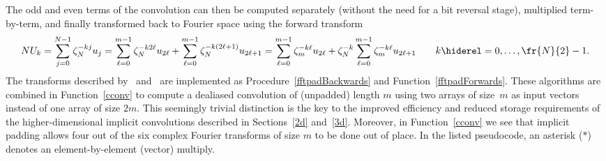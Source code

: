 \documentclass[final]{siamltex}
\def\bel{\begin{dmath}}
\def\eel{\end{dmath}}
\def\no{\hiderel}
\begin{document}
The odd and even terms of the convolution can then be computed separately
(without the need for a bit reversal stage), multiplied term-by-term, and
finally transformed back to Fourier space using the forward transform
\bel
NU_k=\sum_{j=0}^{N-1}\zeta_N^{-kj} u_j
=\sum_{\ell=0}^{m-1}\zeta_N^{-k2\ell} u_{2\ell}
+\sum_{\ell=0}^{m-1}\zeta_N^{-k(2\ell+1)} u_{2\ell+1}
=\sum_{\ell=0}^{m-1}\zeta_m^{-k\ell} u_{2\ell}
+\zeta_N^{-k}\sum_{\ell=0}^{m-1}\zeta_m^{-k\ell} u_{2\ell+1}
\qquad k\no=0,\ldots,\fr{N}{2}-1.\label{cconv1forwards}
\eel
The transforms described by~ and~
are implemented as Procedure~\ref{fftpadBackwards} and
Function~\ref{fftpadForwards}.
These algorithms are combined in Function~\ref{cconv} to 
compute a dealiased convolution of (unpadded) length $m$ using
two arrays of size~$m$ as input vectors instead of one array of size $2m$.
This seemingly trivial distinction is the key to the improved efficiency
and reduced storage requirements of the higher-dimensional implicit
convolutions described in Sections~\ref{2d} and~\ref{3d}.
Moreover, in Function~\ref{cconv} we see that implicit padding allows four
out of the six complex Fourier transforms of size $m$ to be done out of place.
In the listed pseudocode, an asterisk ($*$) denotes an element-by-element
(vector) multiply.

\setlength{\algomargin}{0.6em}
\SetAlCapSkip{3pt}
\def\fft{{\tt fft}}
\def\crfft{{\tt crfft}}
\def\rcfft{{\tt rcfft}}
\def\fftOpadBackwards{{\tt fft0padBackwards}}
\def\fftOpadForwards{{\tt fft0padForwards}}
\def\fftObipadBackwards{{\tt fft0bipadBackwards}}
\def\fftObipadForwards{{\tt fft0bipadForwards}}
\end{document}
